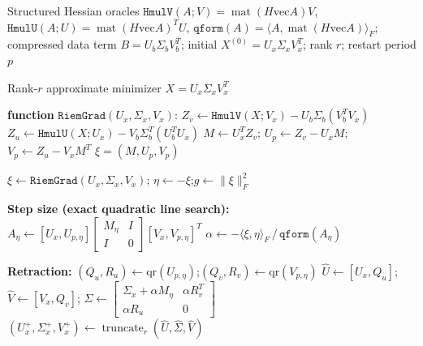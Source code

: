 \begin{algorithm}
\caption{Riemannian CG on $\mathcal{M}_r$ (factored, no $n\times n$ objects)}
\label{alg:RCG}
\begin{algorithmic}[1]

\Require Structured Hessian oracles $\texttt{HmulV}(A;V)\!=\!\operatorname{mat}(H\mathrm{vec}A)V$,
         $\texttt{HmulU}(A;U)\!=\!\operatorname{mat}(H\mathrm{vec}A)^TU$,
         $\texttt{qform}(A)\!=\!\langle A, \operatorname{mat}(H\mathrm{vec}A)\rangle_F$;
         compressed data term $B = U_b\Sigma_b V_b^T$;
         initial $X^{(0)} = U_x\Sigma_x V_x^T$; rank $r$; restart period $p$

\Ensure Rank-$r$ approximate minimizer $X = U_x\Sigma_x V_x^T$

\State \textbf{function} $\texttt{RiemGrad}(U_x,\Sigma_x,V_x)$:
\State \quad $Z_v \gets \texttt{HmulV}(X; V_x) - U_b\Sigma_b(V_b^TV_x)$
\State \quad $Z_u \gets \texttt{HmulU}(X; U_x) - V_b\Sigma_b^T(U_b^TU_x)$
\State \quad $M \gets U_x^T Z_v$;\; $U_p \gets Z_v - U_xM$;\; $V_p \gets Z_u - V_xM^T$
\State \quad \Return $\xi = (M, U_p, V_p)$

\State $\xi \gets \texttt{RiemGrad}(U_x,\Sigma_x,V_x)$;\quad
       $\eta \gets -\xi$;\quad $g \gets \|\xi\|_F^2$


    \State \textbf{Step size (exact quadratic line search):}
    \State $A_\eta \gets [U_x, U_{p,\eta}]
            \left[\begin{smallmatrix} M_\eta & I \\ I & 0 \end{smallmatrix}\right]
            [V_x, V_{p,\eta}]^T$ 
    \State $\alpha \gets -\langle \xi, \eta\rangle_F \,/\, \texttt{qform}(A_\eta)$

    \State \textbf{Retraction:}
    \State $(Q_u,R_u) \gets \mathrm{qr}(U_{p,\eta})$;\quad $(Q_v,R_v) \gets \mathrm{qr}(V_{p,\eta})$
    \State $\hat U \gets [U_x, Q_u]$;\quad $\hat V \gets [V_x, Q_v]$;\quad
           $\hat\Sigma \gets \left[\begin{smallmatrix}
           \Sigma_x + \alpha M_\eta & \alpha R_v^T \\ \alpha R_u & 0
           \end{smallmatrix}\right]$
    \State $(U_x^+,\Sigma_x^+,V_x^+) \gets \operatorname{truncate}_r(\hat U,\hat\Sigma,\hat V)$


\end{algorithmic}
\end{algorithm}
